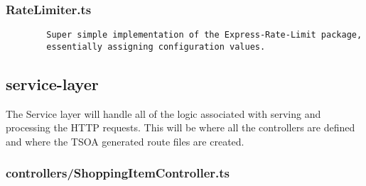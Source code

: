 \subsubsection{RateLimiter.ts}

\begin{verbatim}
        Super simple implementation of the Express-Rate-Limit package,
        essentially assigning configuration values.
\end{verbatim}
\subsection{service-layer}
The Service layer will handle all of the logic associated with serving and processing the HTTP requests. This will be where all the controllers are defined and where the TSOA generated route files are created.
\subsubsection{controllers/ShoppingItemController.ts}
